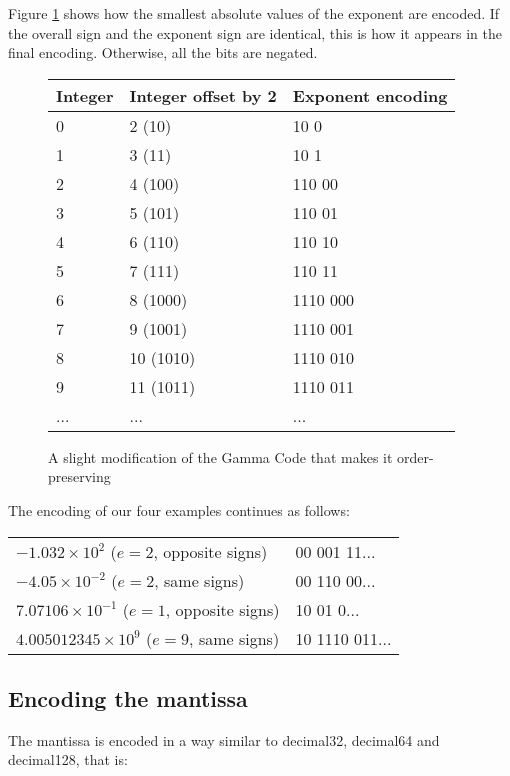 \documentclass{acm_proc_article-sp}
\begin{document}
Figure \ref{figure-exponent-encoding} shows how the smallest absolute values of the exponent are encoded. If the overall sign and the exponent sign are identical, this is how it appears in the final encoding. Otherwise, all the bits are negated.

\begin{figure}
\caption{A slight modification of the Gamma Code that makes it order-preserving}
\label{figure-exponent-encoding}
\center
\begin{tabular}{|l|l|l|}
\hline
Integer & Integer offset by 2 & Exponent encoding\\
\hline
0 & 2 (10) & 10 0 \\
\hline
1 & 3 (11) & 10 1  \\
\hline
2 & 4 (100) & 110 00  \\
\hline
3 & 5 (101) & 110 01 \\
\hline
4 & 6 (110) & 110 10 \\
\hline
5 & 7 (111) & 110 11 \\
\hline
6 & 8 (1000) & 1110 000 \\
\hline
7 & 9 (1001) & 1110 001 \\
\hline
8 & 10 (1010) & 1110 010 \\
\hline
9 & 11 (1011) & 1110 011 \\
\hline
... & ... & ...\\
\hline
\end{tabular}
\end{figure}

The encoding of our four examples continues as follows:

\begin{tabular}{l|l}
$- 1.032 \times 10^2$ ($e=2$, opposite signs) & 00 001 11... \\

$-4.05 \times 10^{-2}$ ($e=2$, same signs) & 00 110 00... \\

$7.07106 \times 10^{-1}$ ($e=1$, opposite signs) & 10 01 0... \\

$4.005012345 \times 10^9$ ($e=9$, same signs) & 10 1110 011...\\
\end{tabular}


\subsection{Encoding the mantissa}

The mantissa is encoded in a way similar to decimal32, decimal64 and decimal128, that is:
\end{document}
